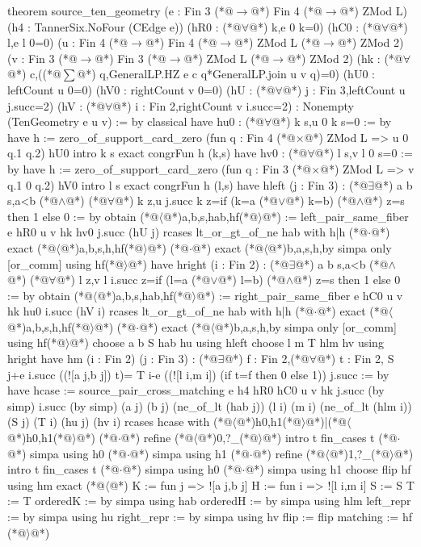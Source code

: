 theorem source_ten_geometry (e : Fin 3 (*@$\to$@*) Fin 4 (*@$\to$@*) ZMod L)
    (h4 : TannerSix.NoFour (CEdge e))
    (hR0 : (*@$\forall$@*) k,e 0 k=0) (hC0 : (*@$\forall$@*) l,e l 0=0)
    (u : Fin 4 (*@$\to$@*) Fin 4 (*@$\to$@*) ZMod L (*@$\to$@*) ZMod 2)
    (v : Fin 3 (*@$\to$@*) Fin 3 (*@$\to$@*) ZMod L (*@$\to$@*) ZMod 2)
    (hk : (*@$\forall$@*) c,((*@$\sum$@*) q,GeneralLP.HZ e c q*GeneralLP.join u v q)=0)
    (hU0 : leftCount u 0=0) (hV0 : rightCount v 0=0)
    (hU : (*@$\forall$@*) j : Fin 3,leftCount u j.succ=2)
    (hV : (*@$\forall$@*) i : Fin 2,rightCount v i.succ=2) : Nonempty (TenGeometry e u v) := by
  classical
  have hu0 : (*@$\forall$@*) k s,u 0 k s=0 := by
    have h := zero_of_support_card_zero (fun q : Fin 4 (*@$\times$@*) ZMod L => u 0 q.1 q.2) hU0
    intro k s
    exact congrFun h (k,s)
  have hv0 : (*@$\forall$@*) l s,v l 0 s=0 := by
    have h := zero_of_support_card_zero (fun q : Fin 3 (*@$\times$@*) ZMod L => v q.1 0 q.2) hV0
    intro l s
    exact congrFun h (l,s)
  have hleft (j : Fin 3) : (*@$\exists$@*) a b s,a<b (*@$\land$@*)
      (*@$\forall$@*) k z,u j.succ k z=if (k=a (*@$\lor$@*) k=b) (*@$\land$@*) z=s then 1 else 0 := by
    obtain (*@$\langle$@*)a,b,s,hab,hf(*@$\rangle$@*) := left_pair_same_fiber e hR0 u v hk hv0 j.succ (hU j)
    rcases lt_or_gt_of_ne hab with h|h
    (*@$\cdot$@*) exact (*@$\langle$@*)a,b,s,h,hf(*@$\rangle$@*)
    (*@$\cdot$@*) exact (*@$\langle$@*)b,a,s,h,by simpa only [or_comm] using hf(*@$\rangle$@*)
  have hright (i : Fin 2) : (*@$\exists$@*) a b s,a<b (*@$\land$@*)
      (*@$\forall$@*) l z,v l i.succ z=if (l=a (*@$\lor$@*) l=b) (*@$\land$@*) z=s then 1 else 0 := by
    obtain (*@$\langle$@*)a,b,s,hab,hf(*@$\rangle$@*) := right_pair_same_fiber e hC0 u v hk hu0 i.succ (hV i)
    rcases lt_or_gt_of_ne hab with h|h
    (*@$\cdot$@*) exact (*@$\langle$@*)a,b,s,h,hf(*@$\rangle$@*)
    (*@$\cdot$@*) exact (*@$\langle$@*)b,a,s,h,by simpa only [or_comm] using hf(*@$\rangle$@*)
  choose a b S hab hu using hleft
  choose l m T hlm hv using hright
  have hm (i : Fin 2) (j : Fin 3) : (*@$\exists$@*) f : Fin 2,(*@$\forall$@*) t : Fin 2,
      S j+e i.succ ((![a j,b j]) t)=
        T i-e ((![l i,m i]) (if t=f then 0 else 1)) j.succ := by
    have hcase := source_pair_cross_matching e h4 hR0 hC0 u v hk j.succ (by simp)
      i.succ (by simp) (a j) (b j) (ne_of_lt (hab j)) (l i) (m i) (ne_of_lt (hlm i))
      (S j) (T i) (hu j) (hv i)
    rcases hcase with (*@$\langle$@*)h0,h1(*@$\rangle$@*)|(*@$\langle$@*)h0,h1(*@$\rangle$@*)
    (*@$\cdot$@*) refine (*@$\langle$@*)0,?_(*@$\rangle$@*)
      intro t
      fin_cases t
      (*@$\cdot$@*) simpa using h0
      (*@$\cdot$@*) simpa using h1
    (*@$\cdot$@*) refine (*@$\langle$@*)1,?_(*@$\rangle$@*)
      intro t
      fin_cases t
      (*@$\cdot$@*) simpa using h0
      (*@$\cdot$@*) simpa using h1
  choose flip hf using hm
  exact (*@$\langle$@*){
    K := fun j => ![a j,b j]
    H := fun i => ![l i,m i]
    S := S
    T := T
    orderedK := by simpa using hab
    orderedH := by simpa using hlm
    left_repr := by simpa using hu
    right_repr := by simpa using hv
    flip := flip
    matching := hf
  }(*@$\rangle$@*)

